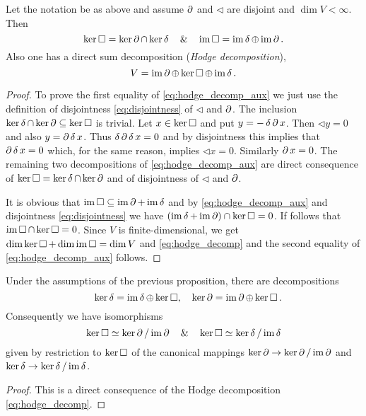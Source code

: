 \begin{proposition}%
 Let the notation be as above and assume $\lcd$ and $\lhd$ are disjoint and $\dim V < \infty$. Then
 \begin{equation}\label{eq:hodge_decomp_aux}
  \ker \lap = \ker \lcd \cap \ker\lhd \quad \& \quad  \im \lap = \im \lhd \oplus \im \lcd.
 \end{equation}
 Also one has a direct sum decomposition (\emph{Hodge decomposition}),
 \begin{equation}\label{eq:hodge_decomp}
    V = \im \lcd \oplus \ker \lap \oplus \im \lhd.
 \end{equation}
\end{proposition}
\begin{proof}
To prove the first equality of \eqref{eq:hodge_decomp_aux} we just use the definition of disjointness \eqref{eq:disjointness} of $\lhd$ and $\lcd$. The inclusion $\ker \lhd \cap \ker \lcd \subseteq \ker\lap$ is trivial. Let $x \in \ker \lap$ and put $y=-\lhd\lcd x$. Then $\lhd y =0$ and also $y =\lcd\lhd x$. Thus $\lhd\lcd\lhd x = 0$ and by disjointness this implies that $\lcd\lhd x = 0$ which, for the same reason, implies $\lhd x = 0$. Similarly $\lcd x = 0$. The remaining two decompositions of \eqref{eq:hodge_decomp_aux} are direct consequence of $\ker\lap = \ker\lhd\cap\ker\lcd$ and of disjointness of $\lhd$ and $\lcd$.

 It is obvious that $\im \lap \subseteq \im \lcd + \im \lhd$ and  by \eqref{eq:hodge_decomp_aux} and disjointness \eqref{eq:disjointness} we have $(\im \lhd + \im \lcd) \cap \ker \lap = 0$. If follows that $\im \lap \cap \ker \lap =0$. Since $V$ is finite-dimensional, we get $\dim \ker\lap + \dim \im \lap = \dim V$ and \eqref{eq:hodge_decomp}  and the second equality of \eqref{eq:hodge_decomp_aux} follows.
\end{proof}

\begin{corollary}
 Under the assumptions of the previous proposition, there are decompositions
  \begin{equation}
    \quad \ker \lhd = \im \lhd \oplus \ker \lap, \quad \ker \lcd = \im\lcd\oplus\ker\lap.
  \end{equation}
  Consequently we have isomorphisms
  \begin{equation}\label{eq:kerlap_iso}
    \ker \lap \simeq \ker \lcd /\im \lcd \quad\&\quad \ker \lap \simeq \ker \lhd / \im \lhd
  \end{equation}
  given by restriction to $\ker \lap$ of the canonical mappings $\ker \lcd \to \ker \lcd / \im \lcd$ and $\ker \lhd \to \ker \lhd / \im \lhd$.
\end{corollary}
\begin{proof}
 This is a direct consequence of the Hodge decomposition \eqref{eq:hodge_decomp}.
\end{proof}

